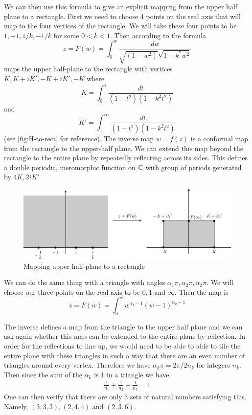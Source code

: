 We can then use this formula to give an explicit mapping from the upper half plane to a rectangle. First we need to choose 4 points on the real axis that will map to the four vertices of the rectangle. We will take these four points to be $1, -1, 1/k, -1/k$ for some $0 < k < 1$. Then according to the formula 
$$ z = F(w) = \int_0^w \frac{dw}{\sqrt{(1 - w^2)}\sqrt{1 - k^2 w^2}} $$
maps the upper half-plane to the rectangle with vertices $K, K + iK', -K + iK', -K$ where 
$$K = \int_0^1 \frac{dt}{(1 - t^2)(1 - k^2t^2)}$$
and 
$$K' = \int_1^\infty \frac{dt}{(1 - t^2)(1 - k^2t^2)}$$
(see \autoref{fig:H-to-rect} for reference).
The inverse map $w = f(z)$ is a conformal map from the rectangle to the upper-half plane. We can extend this map beyond the rectangle to the entire plane by repeatedly reflecting across its sides. This defines a double periodic, meromorphic function on $\mathbb{C}$ with group of periods generated by $4K, 2iK'$

\begin{figure}[ht]
    \centering
    \includegraphics[scale=0.7]{Images/H_to_rect.png}
    \caption{Mapping upper half-plane to a rectangle}
    \label{fig:H-to-rect}
\end{figure}

\secbreak

We can do the same thing with a triangle with angles $\alpha_1 \pi, \alpha_2 \pi, \alpha_3 \pi$. We will choose our three points on the real axis to be $0, 1$ and $\infty$. Then the map is 
$$z = F(w) = \int_0^w w^{\alpha_1 - 1}(w - 1)^{\alpha_2 - 1}$$

The inverse defines a map from the triangle to the upper half plane and we can ask again whether this map can be extended to the entire plane by reflection. In order for the reflections to line up, we would need to be able to able to tile the entire plane with these triangles in such a way that there are an even number of triangles around every vertex. Therefore we have $\alpha_k \pi = 2\pi/2n_k$ for integers $n_k$. Then since the sum of the $\alpha_k$ is 1 in a triangle we have 
\begin{align*}
    \frac{1}{n_1} + \frac{1}{n_2} + \frac{1}{n_3} = 1
\end{align*}
One can then verify that there are only 3 sets of natural numbers satisfying this. Namely, $(3, 3, 3), (2, 4, 4)$ and $(2, 3, 6)$. 

